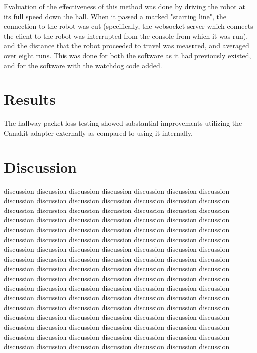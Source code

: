 \documentclass{IEEEtran}
\begin{document}
Evaluation of the effectiveness of this method was done by driving the robot
at its full speed down the hall. When it passed a marked "starting line",
the connection to the robot was cut (specifically, the websocket server which
connects the client to the robot was interrupted from the console from which
it was run), and the distance that the robot proceeded to travel was measured, 
and averaged over eight runs. This was done for both the software as it had
previously existed, and for the software with the watchdog code added.

\section{Results}
The hallway packet loss testing showed substantial improvements utilizing the
Canakit adapter externally as compared to using it internally. 


\section{Discussion}
discussion discussion discussion discussion discussion discussion discussion
discussion discussion discussion discussion discussion discussion discussion
discussion discussion discussion discussion discussion discussion discussion
discussion discussion discussion discussion discussion discussion discussion
discussion discussion discussion discussion discussion discussion discussion
discussion discussion discussion discussion discussion discussion discussion
discussion discussion discussion discussion discussion discussion discussion
discussion discussion discussion discussion discussion discussion discussion
discussion discussion discussion discussion discussion discussion discussion
discussion discussion discussion discussion discussion discussion discussion
discussion discussion discussion discussion discussion discussion discussion
discussion discussion discussion discussion discussion discussion discussion
discussion discussion discussion discussion discussion discussion discussion
discussion discussion discussion discussion discussion discussion discussion
discussion discussion discussion discussion discussion discussion discussion
discussion discussion discussion discussion discussion discussion discussion
discussion discussion discussion discussion discussion discussion discussion
\end{document}
